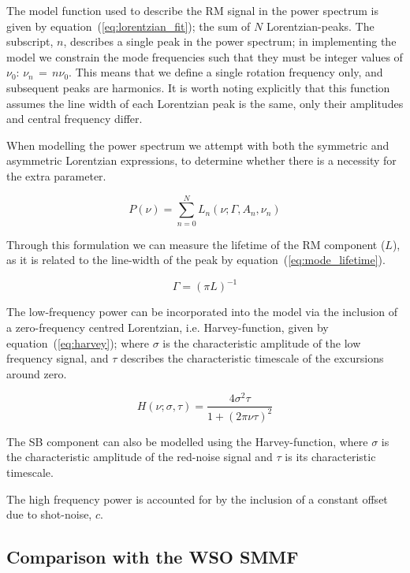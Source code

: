 The model function used to describe the RM signal in the power spectrum is given by equation~(\ref{eq:lorentzian_fit}); the sum of $N$ Lorentzian-peaks. The subscript, $n$, describes a single peak in the power spectrum; in implementing the model we constrain the mode frequencies such that they must be integer values of $\nu_0$: $\nu_n \, = \, n \nu_0$. This means that we define a single rotation frequency only, and subsequent peaks are harmonics. It is worth noting explicitly that this function assumes the line width of each Lorentzian peak is the same, only their amplitudes and central frequency differ.

When modelling the power spectrum we attempt with both the symmetric and asymmetric Lorentzian expressions, to determine whether there is a necessity for the extra parameter.

\begin{equation}
P(\nu) = \sum_{n=0}^{N} L_n(\nu; \Gamma, A_n, \nu_n)
\label{eq:lorentzian_fit}
\end{equation}


Through this formulation we can measure the lifetime of the RM component ($L$), as it is related to the line-width of the peak by equation~(\ref{eq:mode_lifetime}).

\begin{equation}
\Gamma  = (\pi L)^{-1}
\label{eq:mode_lifetime}
\end{equation}


The low-frequency power can be incorporated into the model via the inclusion of a zero-frequency centred Lorentzian, i.e. Harvey-function, given by equation~(\ref{eq:harvey}); where $\sigma$ is the characteristic amplitude of the low frequency signal, and $\tau$ describes the characteristic timescale of the excursions around zero.

\begin{equation}
H(\nu; \sigma, \tau) = \frac{4{\sigma}^2\tau}{1 + (2\pi \nu\tau)^2}
\label{eq:harvey}
\end{equation}

The SB component can also be modelled using the Harvey-function, where $\sigma$ is the characteristic amplitude of the red-noise signal and $\tau$ is its characteristic timescale.

The high frequency power is accounted for by the inclusion of a constant offset due to shot-noise, $c$.


\subsection{Comparison with the WSO SMMF}

